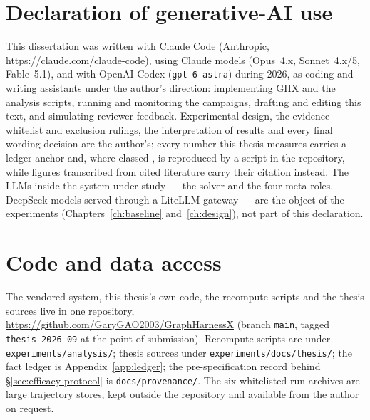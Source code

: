 
\section*{Declaration of generative-AI use}

This dissertation was written with Claude Code (Anthropic,
\url{https://claude.com/claude-code}), using Claude models (Opus~4.x,
Sonnet~4.x/5, Fable~5.1), and with OpenAI Codex (\texttt{gpt-6-astra})
during 2026, as coding and writing assistants under the author's direction: implementing GHX and the analysis scripts,
running and monitoring the campaigns, drafting and editing this text, and
simulating reviewer feedback. Experimental design, the evidence-whitelist
and exclusion rulings, the interpretation of results and every final
wording decision are the author's; every number this thesis measures
carries a ledger anchor and, where classed , is reproduced by a
script in the repository, while figures transcribed from cited literature
carry their citation instead. The LLMs inside the system under study --- the solver and the
four meta-roles, DeepSeek models served through a LiteLLM gateway --- are
the object of the experiments (Chapters~\ref{ch:baseline}
and~\ref{ch:design}), not part of this declaration.

\section*{Code and data access}

The vendored system, this thesis's own code, the recompute scripts
and the thesis sources live in one repository,
\url{https://github.com/GaryGAO2003/GraphHarnessX} (branch
\texttt{main}, tagged \texttt{thesis-2026-09} at the point of
submission). Recompute scripts are under \texttt{experiments/analysis/};
thesis sources under \texttt{experiments/docs/thesis/}; the fact ledger
is Appendix~\ref{app:ledger}; the pre-specification record behind
\S\ref{sec:efficacy-protocol} is \texttt{docs/provenance/}. The six
whitelisted run archives are large trajectory stores, kept outside the
repository and available from the author on request.
